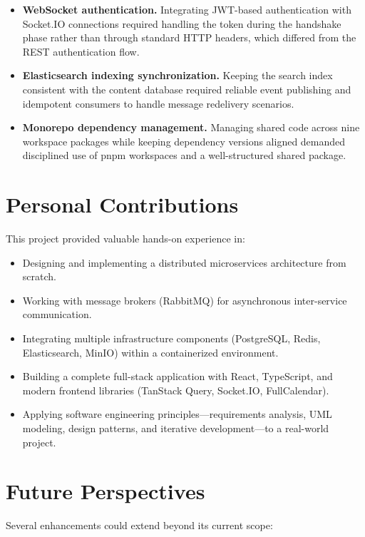 \begin{itemize}[nosep]
  \item \textbf{WebSocket authentication.}
        Integrating JWT-based authentication with Socket.IO connections required handling the token during the handshake phase rather than through standard HTTP headers, which differed from the REST authentication flow.
  \item \textbf{Elasticsearch indexing synchronization.}
        Keeping the search index consistent with the content database required reliable event publishing and idempotent consumers to handle message redelivery scenarios.
  \item \textbf{Monorepo dependency management.}
        Managing shared code across nine workspace packages while keeping dependency versions aligned demanded disciplined use of pnpm workspaces and a well-structured shared package.
\end{itemize}

\section*{Personal Contributions}

This project provided valuable hands-on experience in:

\begin{itemize}[nosep]
  \item Designing and implementing a distributed microservices architecture from scratch.
  \item Working with message brokers (RabbitMQ) for asynchronous inter-service communication.
  \item Integrating multiple infrastructure components (PostgreSQL, Redis, Elasticsearch, MinIO) within a containerized environment.
  \item Building a complete full-stack application with React, TypeScript, and modern frontend libraries (TanStack Query, Socket.IO, FullCalendar).
  \item Applying software engineering principles---requirements analysis, UML modeling, design patterns, and iterative development---to a real-world project.
\end{itemize}

\section*{Future Perspectives}

Several enhancements could extend \eduspace{} beyond its current scope:

